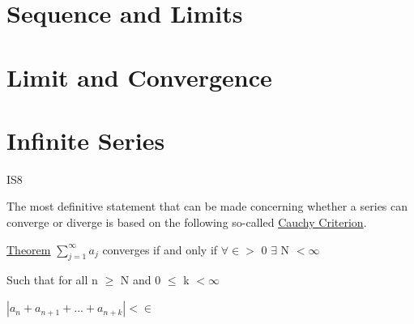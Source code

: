 \documentclass[10pt,a4paper]{article}
\begin{document}



\section{Sequence and Limits}



\section{Limit and Convergence}




\section{Infinite Series}


\newpage
\begin{center}
IS8
\end{center}

The most definitive statement that can be made concerning whether a series can converge or diverge is based on the following so-called \underline{Cauchy Criterion}.

\underline{Theorem}
$\sum_{j=1}^{\infty}a_j$ converges if and only if  $\forall \in >$ 0 $\exists$ N $< \infty$ 

Such that for all n $\ge$ N and 0 $\le$ k $< \infty$

$|a_n + a_{n+1} + ... + a_{n+k}| < \in$
\end{document}
